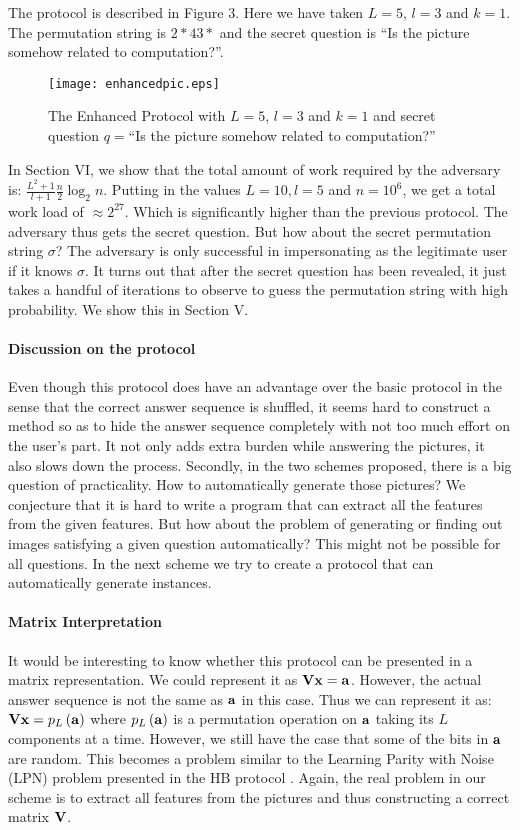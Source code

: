 \documentclass{llncs}
\begin{document}
The protocol is described in Figure 3. Here we have taken $L=5$, $l=3$ and $k=1$. The permutation string is $2*43*$ and the secret question is  ``Is the picture somehow related to computation?''. 
\begin{figure}[ht]
\centerline{\texttt{[image: enhancedpic.eps]}}
\caption{The Enhanced Protocol with $L=5$, $l=3$ and $k=1$ and secret question $q=$``Is the picture somehow related to computation?''}
\label{fig8}
\end{figure}

In Section VI, we show that the total amount of work required by the adversary is: $\frac{{L^2  + 1}}{{l + 1}}\frac{n}{2}\log _2 n$. Putting in the values $L=10, l=5$ and $n=10^6$, we get a total work load of $ \approx 2^{27} $. Which is significantly higher than the previous protocol. The adversary thus gets the secret question. But how about the secret permutation string $\sigma $? The adversary is only successful in impersonating as the legitimate user if it knows $\sigma $. It turns out that after the secret question has been revealed, it just takes a handful of iterations to observe to guess the permutation string with high probability. We show this in Section V.
 
\paragraph*{Discussion on the protocol} Even though this protocol does have an advantage over the basic protocol in the sense that the correct answer sequence is shuffled, it seems hard to construct a method so as to hide the answer sequence completely with not too much effort on the user's part. It not only adds extra burden while answering the pictures, it also slows down the process. Secondly, in the two schemes proposed, there is a big question of practicality. 
How to automatically generate those pictures? We conjecture that it is hard to write a program that can extract all the features from the given features. But how about the problem of generating or finding out images satisfying a given question automatically? This might not be possible for all questions. In the next scheme we try to create a protocol that can automatically generate instances. 
\paragraph*{Matrix Interpretation} It would be interesting to know whether this protocol can be presented in a matrix representation. We could represent it as ${\bf{Vx}} = {\bf{a}}$. However, the actual answer sequence is not the same as ${\bf{a}}$ in this case. Thus we can represent it as: ${\bf{Vx}} = p_L \left( {\bf{a}} \right)$  where $p_L \left( {\bf{a}} \right)$ is a permutation operation on ${\bf{a}}$
 taking its $L$ components at a time. However, we still have the case that some of the bits in ${\bf{a}}$ are random. This becomes a problem similar to the Learning Parity with Noise (LPN) problem presented in the HB protocol \cite{hopper}. Again, the real problem in our scheme is to extract all features from the pictures and thus constructing a correct matrix ${\bf{V}}$.
\end{document}
